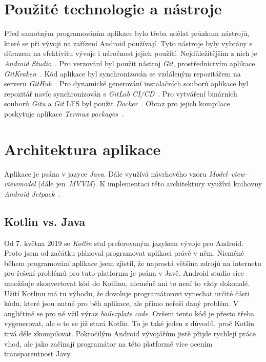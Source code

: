 \section{Použité technologie a nástroje}
Před samotným programováním aplikace bylo třeba udělat průzkum nástrojů, které se při vývoji na zařízení Android používají. Tyto nástroje byly vybrány s důrazem na efektivitu vývoje i náročnost jejich použití. Nejdůležitějším z nich je \emph{Android Studio}~. Pro verzování byl použit nástroj \emph{Git}, prostřednictvím aplikace \emph{GitKraken}~. Kód aplikace byl synchronizován se vzdáleným repozitářem na serveru \emph{GitHub}~. Pro dynamické generování instalačních souborů aplikace byl repozitář navíc synchronizován s \emph{GitLab CI/CD}~. Pro vytváření binárních souborů \emph{Gitu} a \emph{Git} LFS byl použit \emph{Docker}~. Obraz pro jejich kompilace poskytuje aplikace \emph{Termux packages}~.

\section{Architektura aplikace}
Aplikace je psána v jazyce \emph{Java}. Dále využívá návrhového vzoru \emph{Model–view–viewmodel} (dále jen~\emph{MVVM}). K implementaci této architektury využívá knihovny \emph{Android Jetpack}~.

    \subsection{Kotlin vs. Java}
    Od 7. května 2019 se \emph{Kotlin} stal preferovaným jazykem vývoje pro Android. Proto jsem od začátku plánoval programovat aplikaci právě v něm. Nicméně během programování aplikace jsem zjistil, že naprostá většina zdrojů na internetu pro řešení problémů pro tuto platformu je psána v Javě. Android studio sice umožňuje zkonvertovat kód do Kotlinu, nicméně ani to není to vždy dokonalé. Užití Kotlinu má tu výhodu, že dovoluje programátorovi vynechat určité části kódu, které jsou nutné pro běh aplikace, ale přímo neřeší daný problém. V angličtině se pro ně vžil výraz \emph{boilerplate code}. Ovšem tento kód je přesto třeba vygenerovat, ale o to se již stará Kotlin. To je také jeden z důvodů, proč Kotlin trvá déle zkompilovat. Pokročilým Android vývojářům jistě přijde rychlejí práce vhod, ale jako začínají programátor na této platformě více ocením transparentnost Javy.

